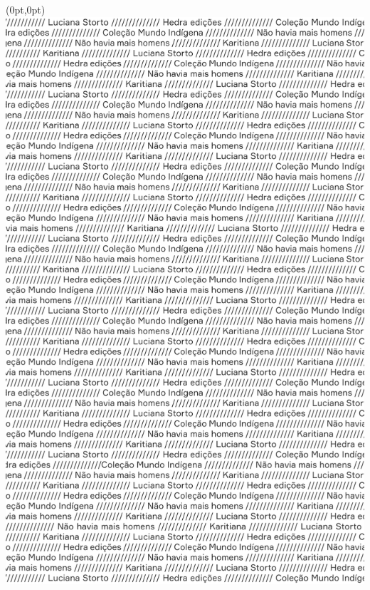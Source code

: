 \thispagestyle{empty}
\begin{textblock*}{2.625in}(0pt,0pt)%
\vspace*{-2.4cm}
\hspace*{-2.3cm}\includegraphics[width=138mm]{./MI_STORTO_HOMENS_ABERTURA.png}  
\end{textblock*}
\clearpage

\thispagestyle{empty}



